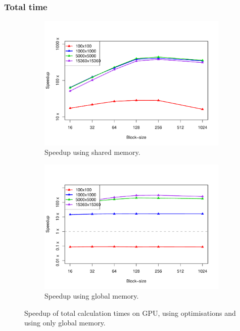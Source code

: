 \documentclass[12pt]{article}
\begin{document}
\subsubsection*{Total time}
\begin{figure}
	\centering
	\begin{subfigure}{0.48\linewidth}
		\centering
		\includegraphics[width=0.85\linewidth]{../plots/tot_shared.pdf}
		\caption{Speedup using shared memory.}
		\label{fig:9}
	\end{subfigure}\hfill
	\begin{subfigure}{0.48\linewidth}
		\centering
		\includegraphics[width=0.85\linewidth]{../plots/tot_glob.pdf}
		\caption{Speedup using global memory.}
		\label{fig:10}
	\end{subfigure}
	\caption{Speedup of total calculation times on GPU, using optimisations and using only global memory.}
\end{figure}
\end{document}
